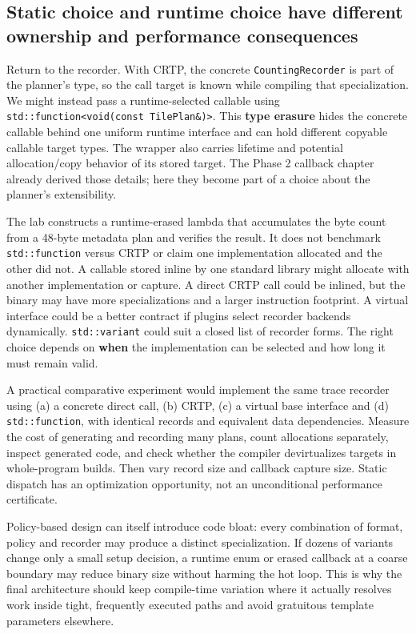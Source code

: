 \subsection{Static choice and runtime choice have different ownership and performance consequences}\label{01-foundations-i-ch005-static-choice-and-runtime-choice-have-different-ownership-and-performance-consequences}

Return to the recorder. With CRTP, the concrete \texttt{CountingRecorder} is part of the planner's type, so the call target is known while compiling that specialization. We might instead pass a runtime-selected callable using \texttt{std::function\textless{}void(const\ TilePlan\&)\textgreater{}}. This \textbf{type erasure} hides the concrete callable behind one uniform runtime interface and can hold different copyable callable target types. The wrapper also carries lifetime and potential allocation/copy behavior of its stored target. The Phase 2 callback chapter already derived those details; here they become part of a choice about the planner's extensibility.

The lab constructs a runtime-erased lambda that accumulates the byte count from a 48-byte metadata plan and verifies the result. It does not benchmark \texttt{std::function} versus CRTP or claim one implementation allocated and the other did not. A callable stored inline by one standard library might allocate with another implementation or capture. A direct CRTP call could be inlined, but the binary may have more specializations and a larger instruction footprint. A virtual interface could be a better contract if plugins select recorder backends dynamically. \texttt{std::variant} could suit a closed list of recorder forms. The right choice depends on \textbf{when} the implementation can be selected and how long it must remain valid.

A practical comparative experiment would implement the same trace recorder using (a) a concrete direct call, (b) CRTP, (c) a virtual base interface and (d) \texttt{std::function}, with identical records and equivalent data dependencies. Measure the cost of generating and recording many plans, count allocations separately, inspect generated code, and check whether the compiler devirtualizes targets in whole-program builds. Then vary record size and callback capture size. Static dispatch has an optimization opportunity, not an unconditional performance certificate.

Policy-based design can itself introduce code bloat: every combination of format, policy and recorder may produce a distinct specialization. If dozens of variants change only a small setup decision, a runtime enum or erased callback at a coarse boundary may reduce binary size without harming the hot loop. This is why the final architecture should keep compile-time variation where it actually resolves work inside tight, frequently executed paths and avoid gratuitous template parameters elsewhere.

